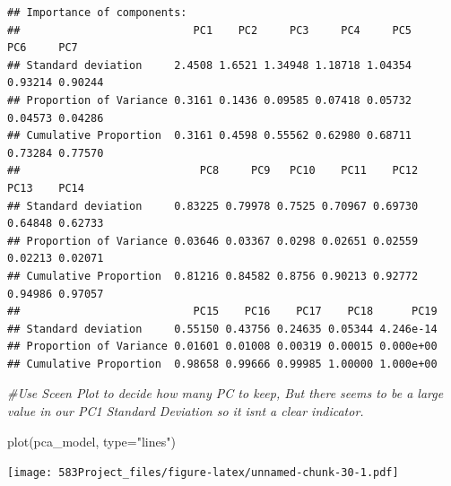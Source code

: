 \documentclass[
]{article}
\newenvironment{Shaded}{\begin{snugshade}}{\end{snugshade}}
\newcommand{\AttributeTok}[1]{\textcolor[rgb]{0.77,0.63,0.00}{#1}}
\newcommand{\CommentTok}[1]{\textcolor[rgb]{0.56,0.35,0.01}{\textit{#1}}}
\newcommand{\DecValTok}[1]{\textcolor[rgb]{0.00,0.00,0.81}{#1}}
\newcommand{\FunctionTok}[1]{\textcolor[rgb]{0.00,0.00,0.00}{#1}}
\newcommand{\NormalTok}[1]{#1}
\newcommand{\SpecialCharTok}[1]{\textcolor[rgb]{0.00,0.00,0.00}{#1}}
\newcommand{\StringTok}[1]{\textcolor[rgb]{0.31,0.60,0.02}{#1}}
\begin{document}
\begin{verbatim}
## Importance of components:
##                           PC1    PC2     PC3     PC4     PC5     PC6     PC7
## Standard deviation     2.4508 1.6521 1.34948 1.18718 1.04354 0.93214 0.90244
## Proportion of Variance 0.3161 0.1436 0.09585 0.07418 0.05732 0.04573 0.04286
## Cumulative Proportion  0.3161 0.4598 0.55562 0.62980 0.68711 0.73284 0.77570
##                            PC8     PC9   PC10    PC11    PC12    PC13    PC14
## Standard deviation     0.83225 0.79978 0.7525 0.70967 0.69730 0.64848 0.62733
## Proportion of Variance 0.03646 0.03367 0.0298 0.02651 0.02559 0.02213 0.02071
## Cumulative Proportion  0.81216 0.84582 0.8756 0.90213 0.92772 0.94986 0.97057
##                           PC15    PC16    PC17    PC18      PC19
## Standard deviation     0.55150 0.43756 0.24635 0.05344 4.246e-14
## Proportion of Variance 0.01601 0.01008 0.00319 0.00015 0.000e+00
## Cumulative Proportion  0.98658 0.99666 0.99985 1.00000 1.000e+00
\end{verbatim}

\begin{Shaded}
\begin{Highlighting}[]
\CommentTok{\#Use Sceen Plot to decide how many PC to keep, But there seems to be a large value in our PC1 Standard Deviation so it isn\textquotesingle{}t a clear indicator.}

\FunctionTok{plot}\NormalTok{(pca\_model, }\AttributeTok{type=}\StringTok{"lines"}\NormalTok{)}
\end{Highlighting}
\end{Shaded}

\texttt{[image: 583Project\_files/figure-latex/unnamed-chunk-30-1.pdf]}

\begin{Shaded}
\end{Shaded}
\end{document}
